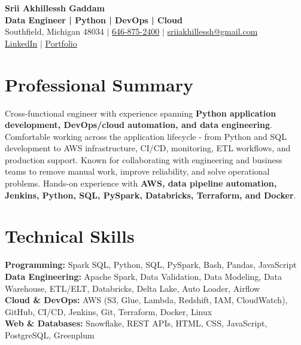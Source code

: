 \documentclass[letterpaper,10pt]{article}
\begin{document}
\fontsize{9.35pt}{10.45pt}\selectfont

\begin{center}
    {\LARGE \textbf{Srii Akhillessh Gaddam}} \\[-1pt]
    \textbf{Data Engineer | Python | DevOps | Cloud} \\[2pt]
    Southfield, Michigan 48034 $|$
    \href{tel:6468752400}{646-875-2400} $|$
    \href{mailto:sriiakhillessh@gmail.com}{sriiakhillessh@gmail.com} \\[1pt]
    \href{https://www.linkedin.com/in/srii-akhiilessh-gaddam-b48668191/}{LinkedIn} $|$
    \href{https://sriiakhillesshg.github.io/portfolio/}{Portfolio}
\end{center}
\vspace{-8pt}

\section{Professional Summary}
\small{Cross-functional engineer with experience spanning \textbf{Python application development, DevOps/cloud automation, and data engineering}. Comfortable working across the application lifecycle - from Python and SQL development to AWS infrastructure, CI/CD, monitoring, ETL workflows, and production support. Known for collaborating with engineering and business teams to remove manual work, improve reliability, and solve operational problems. Hands-on experience with \textbf{AWS, data pipeline automation, Jenkins, Python, SQL, PySpark, Databricks, Terraform, and Docker}.}

\section{Technical Skills}
\small{
\textbf{Programming:} Spark SQL, Python, SQL, PySpark, Bash, Pandas, JavaScript \\
\textbf{Data Engineering:} Apache Spark, Data Validation, Data Modeling, Data Warehouse, ETL/ELT, Databricks, Delta Lake, Auto Loader, Airflow \\
\textbf{Cloud \& DevOps:} AWS (S3, Glue, Lambda, Redshift, IAM, CloudWatch), GitHub, CI/CD, Jenkins, Git, Terraform, Docker, Linux \\
\textbf{Web \& Databases:} Snowflake, REST APIs, HTML, CSS, JavaScript, PostgreSQL, Greenplum
}
\end{document}

